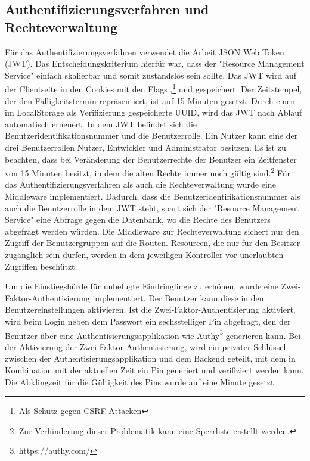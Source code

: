 \subsection{Authentifizierungsverfahren und Rechteverwaltung}
\label{subsec:authentifizierungsverfahrenundrechteverwaltung}
Für das Authentifizierungsverfahren verwendet die Arbeit JSON Web Token (JWT). Das Entscheidungskriterium hierfür war,
dass der "Resource Management Service" einfach skalierbar und somit zustandslos sein sollte. Das JWT wird auf der Clientseite
in den Cookies mit den Flags ,\footnote{Als Schutz gegen CSRF-Attacken}  und 
gespeichert. Der Zeitstempel, der den Fälligkeitstermin repräsentiert, ist auf 15 Minuten gesetzt. Durch einen im LocalStorage
als Verifizierung gespeicherte UUID, wird das JWT nach Ablauf automatisch erneuert. In dem JWT befindet sich die
Benutzeridentifikationsnummer und die Benutzerrolle. Ein Nutzer kann eine der drei Benutzerrollen Nutzer, Entwickler und
Administrator besitzen. Es ist zu beachten, dass bei Veränderung der Benutzerrechte der Benutzer ein Zeitfenster von
15 Minuten besitzt, in dem die alten Rechte immer noch gültig sind.\footnote{Zur Verhinderung dieser Problematik
kann eine Sperrliste erstellt werden.} Für das Authentifizierungsverfahren als auch die Rechteverwaltung
wurde eine Middleware implementiert. Dadurch, dass die Benutzeridentifikationsnummer als auch die Benutzerrolle
in dem JWT steht, spart sich der "Resource Management Service" eine Abfrage gegen die Datenbank, wo die Rechte des Benutzers
abgefragt werden würden. Die Middleware zur Rechteverwaltung sichert nur den Zugriff der Benutzergruppen auf die Routen.
Resourcen, die nur für den Besitzer zugänglich sein dürfen, werden in dem jeweiligen Kontroller vor unerlaubten
Zugriffen beschützt.

Um die Einstiegshürde für unbefugte Eindringlinge zu erhöhen, wurde eine Zwei-Faktor-Authentisierung
implementiert. Der Benutzer kann diese in den Benutzereinstellungen aktivieren. Ist die Zwei-Faktor-Authentisierung aktiviert,
wird beim Login neben dem Passwort ein sechsstelliger Pin abgefragt, den der Benutzer über eine Authentisierungsapplikation
wie Authy\footnote{https://authy.com/} generieren kann. Bei der Aktivierung der Zwei-Faktor-Authentisierung, wird ein
privater Schlüssel zwischen der Authentisierungsapplikation und dem Backend geteilt, mit dem in Kombination mit
der aktuellen Zeit ein Pin generiert und verifiziert werden kann. Die Abklingzeit für die Gültigkeit des Pins wurde
auf eine Minute gesetzt.

